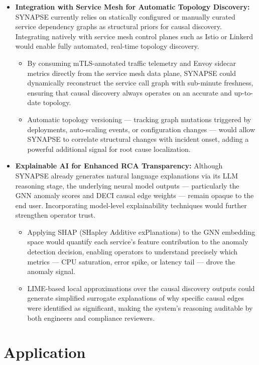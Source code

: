 \begin{itemize}
    \item \textbf{Integration with Service Mesh for Automatic Topology Discovery:}
    SYNAPSE currently relies on statically configured or manually curated service dependency graphs as structural priors for causal discovery. Integrating natively with service mesh control planes such as Istio or Linkerd would enable fully automated, real-time topology discovery.
    \begin{itemize}
        \item By consuming mTLS-annotated traffic telemetry and Envoy sidecar metrics directly from the service mesh data plane, SYNAPSE could dynamically reconstruct the service call graph with sub-minute freshness, ensuring that causal discovery always operates on an accurate and up-to-date topology.
        \item Automatic topology versioning — tracking graph mutations triggered by deployments, auto-scaling events, or configuration changes — would allow SYNAPSE to correlate structural changes with incident onset, adding a powerful additional signal for root cause localization.
    \end{itemize}

    \item \textbf{Explainable AI for Enhanced RCA Transparency:}
    Although SYNAPSE already generates natural language explanations via its LLM reasoning stage, the underlying neural model outputs — particularly the GNN anomaly scores and DECI causal edge weights — remain opaque to the end user. Incorporating model-level explainability techniques would further strengthen operator trust.
    \begin{itemize}
        \item Applying SHAP (SHapley Additive exPlanations) to the GNN embedding space would quantify each service's feature contribution to the anomaly detection decision, enabling operators to understand precisely which metrics — CPU saturation, error spike, or latency tail — drove the anomaly signal.
        \item LIME-based local approximations over the causal discovery outputs could generate simplified surrogate explanations of why specific causal edges were identified as significant, making the system's reasoning auditable by both engineers and compliance reviewers.
    \end{itemize}

\end{itemize}

\section{Application}
\vspace{0.2cm}

